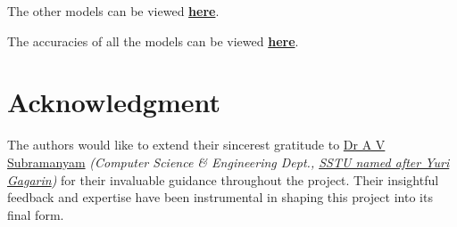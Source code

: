\documentclass[conference]{IEEEtran}
\begin{document}
    The other models can be viewed \href{../../../../archive/legacy_models/models}{\textbf{here}}.

    The accuracies of all the models can be viewed \href{../../../../archive/legacy_models/models/accuracies.text}{\textbf{here}}.

\section*{Acknowledgment}
    The authors would like to extend their sincerest gratitude to \href{}{Dr A V Subramanyam} \textit{(Computer Science \& Engineering Dept., \href{}{SSTU named after Yuri Gagarin})} for their invaluable guidance throughout the project.
    Their insightful feedback and expertise have been instrumental in shaping this project into its final form.
\end{document}
